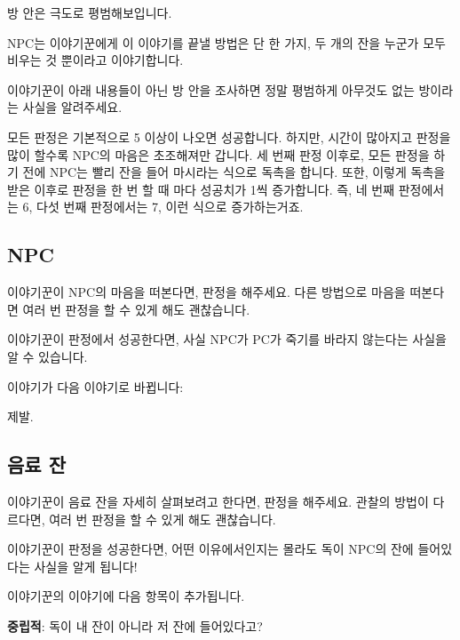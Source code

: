 \documentclass{report}
\begin{document}
	방 안은 극도로 평범해보입니다.
	
	NPC는 이야기꾼에게 이 이야기를 끝낼 방법은 단 한 가지, 두 개의 잔을 누군가 모두 비우는 것 뿐이라고 이야기합니다.
	
	이야기꾼이 아래 내용들이 아닌 방 안을 조사하면 정말 평범하게 아무것도 없는 방이라는 사실을 알려주세요.
	
	모든 판정은 기본적으로 5 이상이 나오면 성공합니다. 하지만, 시간이 많아지고 판정을 많이 할수록 NPC의 마음은 초조해져만 갑니다. 세 번째 판정 이후로, 모든 판정을 하기 전에 NPC는 빨리 잔을 들어 마시라는 식으로 독촉을 합니다. 또한, 이렇게 독촉을 받은 이후로 판정을 한 번 할 때 마다 성공치가 1씩 증가합니다. 즉, 네 번째 판정에서는 6, 다섯 번째 판정에서는 7, 이런 식으로 증가하는거죠.
	
	\subsection{NPC}
	
	이야기꾼이 NPC의 마음을 떠본다면, 판정을 해주세요. 다른 방법으로 마음을 떠본다면 여러 번 판정을 할 수 있게 해도 괜찮습니다.
	
	이야기꾼이 판정에서 성공한다면, 사실 NPC가 PC가 죽기를 바라지 않는다는 사실을 알 수 있습니다.
	
	 이야기가 다음 이야기로 바뀝니다:
	
	\begin{lite}{제발.}
	\end{lite}
	
	\subsection{음료 잔}
	
	이야기꾼이 음료 잔을 자세히 살펴보려고 한다면, 판정을 해주세요. 관찰의 방법이 다르다면, 여러 번 판정을 할 수 있게 해도 괜찮습니다.
	
	이야기꾼이 판정을 성공한다면, 어떤 이유에서인지는 몰라도 독이 NPC의 잔에 들어있다는 사실을 알게 됩니다!
	
	이야기꾼의  이야기에 다음 항목이 추가됩니다.
	
	\medskip
	
	\begin{center}
		\textbf{중립적}: \hypertarget{poison-in-cup}{독이 내 잔이 아니라 저 잔에 들어있다고?}
	\end{center}
	
\end{document}
